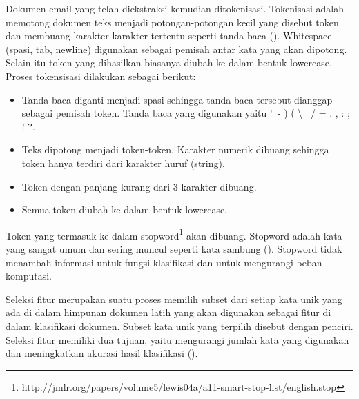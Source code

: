 Dokumen email yang telah diekstraksi kemudian ditokenisasi. Tokenisasi adalah memotong dokumen teks menjadi potongan-potongan kecil yang disebut token dan membuang karakter-karakter tertentu seperti tanda baca (\cite{MANNING}). Whitespace (spasi, tab, newline) digunakan sebagai pemisah antar kata yang akan dipotong. Selain itu token yang dihasilkan biasanya diubah ke dalam bentuk lowercase. Proses tokensisasi dilakukan sebagai berikut:
\begin{itemize}
	\item Tanda baca diganti menjadi spasi sehingga tanda baca tersebut dianggap sebagai pemisah token. Tanda baca yang digunakan yaitu \'~- ) ( \textbackslash~ / = . , : ; ! ?.
	\item Teks dipotong menjadi token-token. Karakter numerik dibuang sehingga token hanya terdiri dari karakter huruf (string).
	\item Token dengan panjang kurang dari 3 karakter dibuang.
	\item Semua token diubah ke dalam bentuk lowercase.
\end{itemize}

Token yang termasuk ke dalam stopword\footnote{http://jmlr.org/papers/volume5/lewis04a/a11-smart-stop-list/english.stop} akan dibuang. Stopword adalah kata yang sangat umum dan sering muncul seperti kata sambung (\cite{MANNING}). Stopword tidak menambah informasi untuk fungsi klasifikasi dan untuk mengurangi beban komputasi.

Seleksi fitur merupakan suatu proses memilih subset dari setiap kata unik yang ada di dalam himpunan dokumen latih yang akan digunakan sebagai fitur di dalam klasifikasi dokumen. Subset kata unik yang terpilih disebut dengan penciri. Seleksi fitur memiliki dua tujuan, yaitu mengurangi jumlah kata yang digunakan dan meningkatkan akurasi hasil klasifikasi (\cite{MANNING}).

